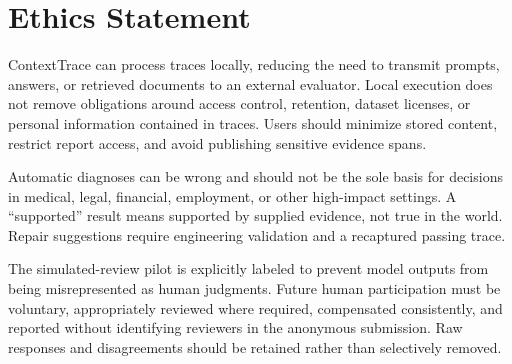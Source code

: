 \section{Ethics Statement}
ContextTrace can process traces locally, reducing the need to transmit prompts,
answers, or retrieved documents to an external evaluator. Local execution does
not remove obligations around access control, retention, dataset licenses, or
personal information contained in traces. Users should minimize stored content,
restrict report access, and avoid publishing sensitive evidence spans.

Automatic diagnoses can be wrong and should not be the sole basis for decisions
in medical, legal, financial, employment, or other high-impact settings. A
``supported'' result means supported by supplied evidence, not true in the
world. Repair suggestions require engineering validation and a recaptured
passing trace.

The simulated-review pilot is explicitly labeled to prevent model outputs from
being misrepresented as human judgments. Future human participation must be
voluntary, appropriately reviewed where required, compensated consistently,
and reported without identifying reviewers in the anonymous submission. Raw
responses and disagreements should be retained rather than selectively removed.
